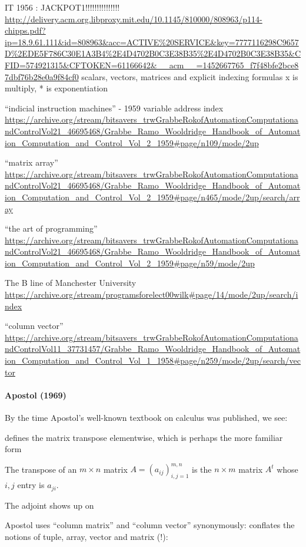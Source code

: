 IT 1956 : JACKPOT1!!!!!!!!!!!!!!!
\url{http://delivery.acm.org.libproxy.mit.edu/10.1145/810000/808963/p114-chipps.pdf?ip=18.9.61.111&id=808963&acc=ACTIVE%20SERVICE&key=7777116298C9657D%2EDE5F786C30E1A3B4%2E4D4702B0C3E38B35%2E4D4702B0C3E38B35&CFID=574921315&CFTOKEN=61166642&__acm__=1452667765_f7f48bfe2bce87dbf76b28e0a9f84cf0}
scalars, vectors, matrices  and explicit indexing formulas
x is multiply, * is exponentiation


“indicial instruction machines” - 1959
variable address index
\url{https://archive.org/stream/bitsavers_trwGrabbeRokofAutomationComputationandControlVol21_46695468/Grabbe_Ramo_Wooldridge_Handbook_of_Automation_Computation_and_Control_Vol_2_1959#page/n109/mode/2up}

“matrix array”
\url{https://archive.org/stream/bitsavers_trwGrabbeRokofAutomationComputationandControlVol21_46695468/Grabbe_Ramo_Wooldridge_Handbook_of_Automation_Computation_and_Control_Vol_2_1959#page/n465/mode/2up/search/array}

“the art of programming”
\url{https://archive.org/stream/bitsavers_trwGrabbeRokofAutomationComputationandControlVol21_46695468/Grabbe_Ramo_Wooldridge_Handbook_of_Automation_Computation_and_Control_Vol_2_1959#page/n59/mode/2up}

The B line of Manchester University
\url{https://archive.org/stream/programsforelect00wilk#page/14/mode/2up/search/index}

“column vector”
\url{https://archive.org/stream/bitsavers_trwGrabbeRokofAutomationComputationandControlVol11_37731457/Grabbe_Ramo_Wooldridge_Handbook_of_Automation_Computation_and_Control_Vol_1_1958#page/n259/mode/2up/search/vector}


\paragraph{Apostol (1969)~\cite{Apostol1969}}

By the time Apostol's well-known textbook on calculus was published, we see:

\cite[p. 91]{Apostol1969} defines the matrix transpose elementwise, which is perhaps the more familiar form

The transpose of an $m \times n$ matrix $A = \left( a_{ij} \right)^{m,n}_{i,j=1}$ is the $n \times m$ matrix $A^t$ whose $i, j$ entry is $a_{ji}$.

The adjoint shows up on \cite[p. 122]{Apostol1969}

Apostol uses ``column matrix'' and ``column vector'' synonymously: \cite[p. 592]{Apostol1967} conflates the notions of tuple, array, vector and matrix (!):

